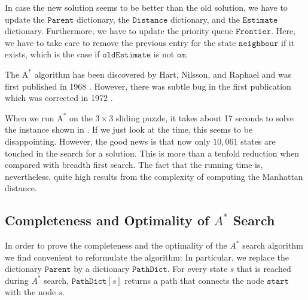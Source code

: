 \begin{enumerate}
\begin{enumerate}
            In case the new solution seems to be better than the old solution, we have to update
            the $\mathtt{Parent}$ dictionary, the $\mathtt{Distance}$ dictionary, and the $\mathtt{Estimate}$
            dictionary.  Furthermore, we have to update the priority queue $\mathtt{Frontier}$.
            Here, we have to take care to remove the previous entry for the state
            $\mathtt{neighbour}$ if it exists, which is the case if $\mathtt{oldEstimate}$ is not $\mathtt{om}$.
      \end{enumerate}
\end{enumerate}
The $\mathrm{A}^*$ algorithm has been discovered by Hart, Nilsson, and Raphael and was first published in
1968 \cite{hart:1968}.  However, there was subtle bug in the first publication which was corrected
in 1972 \cite{hart:1972}.

When we run $\mathrm{A}^*$ on the $3 \times 3$ sliding puzzle, it takes about 17 seconds to solve the instance
shown in .  If we just look at the time, this seems to be disappointing.  However, the good
news is that now only $10,061$ states are touched in the search for a solution.  This is more than a tenfold
reduction when compared with breadth first search.  The fact that the running time
is, nevertheless, quite high results from the complexity of computing the Manhattan distance.


\subsection{Completeness and Optimality of $A^*$ Search}
In order to prove the completeness and the optimality of the $A^*$ search algorithm we find convenient to
reformulate the algorithm:  In particular, we replace the dictionary $\texttt{Parent}$ by a dictionary
$\texttt{PathDict}$. For every state $s$ that is reached during $A^*$ search, $\texttt{PathDict}[s]$ returns a
path that connects the node $\texttt{start}$ with the node $s$.

